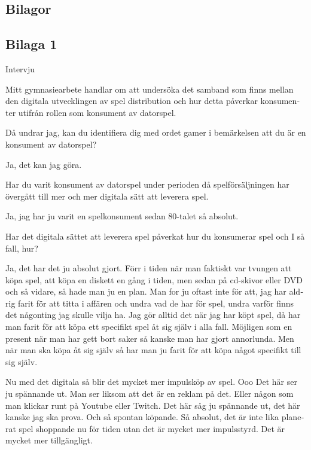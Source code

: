 \documentclass[11p]{article}
\begin{document}
\begin{otherlanguage}{swedish}
        \newpage
        \section{Bilagor}

        \subsection{Bilaga 1}
        Intervju

        Mitt gymnasiearbete handlar om att undersöka det samband som finns mellan den digitala utvecklingen av spel distribution och hur detta påverkar konsumenter utifrån rollen som konsument av datorspel.

        Då undrar jag, kan du identifiera dig med ordet gamer i bemärkelsen att du är en konsument av datorspel?


        \setlength{\leftskip}{1cm}

        Ja, det kan jag göra.

        \setlength{\leftskip}{0cm}
        Har du varit konsument av datorspel under perioden då spelförsäljningen har övergått till mer och mer digitala sätt att leverera spel.


        \setlength{\leftskip}{1cm}

        Ja, jag har ju varit en spelkonsument sedan 80-talet så absolut.

        \setlength{\leftskip}{0cm}
        Har det digitala sättet att leverera spel påverkat hur du konsumerar spel och I så fall, hur?


        \setlength{\leftskip}{1cm}

        Ja, det har det ju absolut gjort.
        Förr i tiden när man faktiskt var tvungen att köpa spel, att köpa en diskett en gång i tiden, men sedan på cd-skivor eller DVD och så vidare, så hade man ju en plan.
        Man for ju oftast inte för att, jag har aldrig farit för att titta i affären och undra vad de har för spel, undra varför finns det någonting jag skulle vilja ha. Jag gör alltid det när jag har köpt spel, då har man farit för att köpa ett specifikt spel åt sig själv i alla fall. Möjligen som en present när man har gett bort saker så kanske man har gjort annorlunda.
        Men när man ska köpa åt sig själv så har man ju farit för att köpa något specifikt till sig själv.

        Nu med det digitala så blir det mycket mer impulsköp av spel. Ooo Det här ser ju spännande ut.
        Man ser liksom att det är en reklam på det. Eller någon som man klickar runt på  Youtube eller Twitch. Det här såg ju spännande ut, det här kanske jag ska prova. Och så spontan köpande.
        Så absolut, det är inte lika planerat spel shoppande nu för tiden utan det är mycket mer impulsstyrd. Det är mycket mer tillgängligt.



\end{otherlanguage}
\end{document}
